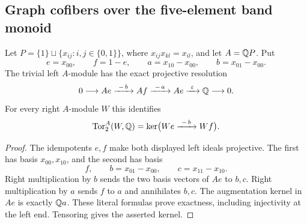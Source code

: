 \subsection{Graph cofibers over the five-element band monoid}

\begin{lemma}
\label{C:P5-trivial-two-step}
Let $P=\{1\}\sqcup\{x_{ij}:i,j\in\{0,1\}\}$, where
$x_{ij}x_{kl}=x_{il}$, and let $A=\mathbb Q P$.
Put
\[
 e=x_{00},\qquad f=1-e,\qquad
 a=x_{10}-x_{00},\qquad b=x_{01}-x_{00}.
\]
The trivial left $A$-module has the exact projective resolution
\[
 0\longrightarrow Ae\xrightarrow{\ {-}\,b\ }Af
   \xrightarrow{\ {-}\,a\ }Ae
   \xrightarrow{\ \varepsilon\ }\mathbb Q\longrightarrow0.
\]
For every right $A$-module $W$ this identifies
\[
 \operatorname{Tor}_2^A(W,\mathbb Q)
   =\ker\bigl(We\xrightarrow{\ {-}\,b\ }Wf\bigr).
\]
\end{lemma}
\begin{proof}
The idempotents $e,f$ make both displayed left ideals projective.
The first has basis $x_{00},x_{10}$, and the second has basis
\[
 f,\qquad b=x_{01}-x_{00},\qquad c=x_{11}-x_{10}.
\]
Right multiplication by $b$ sends the two basis vectors of $Ae$
to $b,c$.  Right multiplication by $a$ sends $f$ to $a$ and
annihilates $b,c$.  The augmentation kernel in $Ae$ is exactly
$\mathbb Q a$.  These literal formulas prove exactness, including
injectivity at the left end.  Tensoring gives the asserted kernel.
\end{proof}

